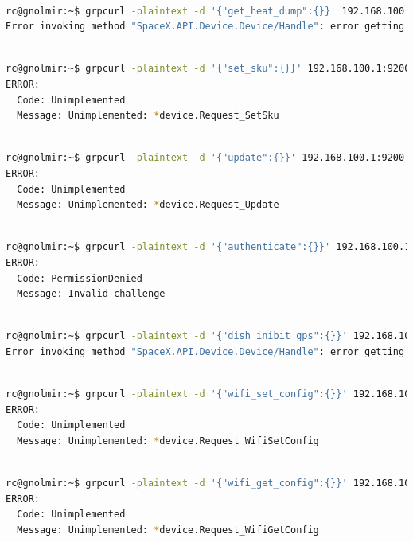 \documentclass[IN,11pt,twoside,openright,idp,english]{tumthesis}
\begin{document}
 \begin{lstlisting}[language=bash,basicstyle=\tiny]

rc@gnolmir:~$ grpcurl -plaintext -d '{"get_heat_dump":{}}' 192.168.100.1:9200 SpaceX.API.Device.Device/Handle
Error invoking method "SpaceX.API.Device.Device/Handle": error getting request data: message type SpaceX.API.Device.Request has no known field named get_heat_dump
\end{lstlisting}
\begin{lstlisting}[language=bash,basicstyle=\tiny]

rc@gnolmir:~$ grpcurl -plaintext -d '{"set_sku":{}}' 192.168.100.1:9200 SpaceX.API.Device.Device/Handle
ERROR:
  Code: Unimplemented
  Message: Unimplemented: *device.Request_SetSku
 \end{lstlisting}
\begin{lstlisting}[language=bash,basicstyle=\tiny]

rc@gnolmir:~$ grpcurl -plaintext -d '{"update":{}}' 192.168.100.1:9200 SpaceX.API.Device.Device/Handle
ERROR:
  Code: Unimplemented
  Message: Unimplemented: *device.Request_Update
\end{lstlisting}
\begin{lstlisting}[language=bash,basicstyle=\tiny]

rc@gnolmir:~$ grpcurl -plaintext -d '{"authenticate":{}}' 192.168.100.1:9200 SpaceX.API.Device.Device/Handle
ERROR:
  Code: PermissionDenied
  Message: Invalid challenge
\end{lstlisting}
\begin{lstlisting}[language=bash,basicstyle=\tiny]

rc@gnolmir:~$ grpcurl -plaintext -d '{"dish_inibit_gps":{}}' 192.168.100.1:9200 SpaceX.API.Device.Device/Handle
Error invoking method "SpaceX.API.Device.Device/Handle": error getting request data: message type SpaceX.API.Device.Request has no known field named dish_inibit_gps
\end{lstlisting}
\begin{lstlisting}[language=bash,basicstyle=\tiny]

rc@gnolmir:~$ grpcurl -plaintext -d '{"wifi_set_config":{}}' 192.168.100.1:9200 SpaceX.API.Device.Device/Handle
ERROR:
  Code: Unimplemented
  Message: Unimplemented: *device.Request_WifiSetConfig
\end{lstlisting}
\begin{lstlisting}[language=bash,basicstyle=\tiny]

rc@gnolmir:~$ grpcurl -plaintext -d '{"wifi_get_config":{}}' 192.168.100.1:9200 SpaceX.API.Device.Device/Handle
ERROR:
  Code: Unimplemented
  Message: Unimplemented: *device.Request_WifiGetConfig
\end{lstlisting}
\end{document}
